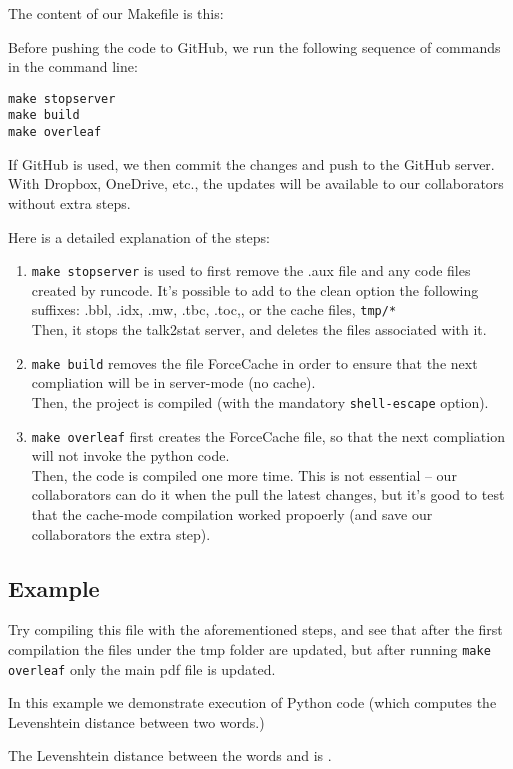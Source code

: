 \documentclass[12pt]{article}
\begin{document}
The content of our Makefile is this:

Before pushing the code to GitHub, we run the following sequence of commands in the command line:
\begin{tcolorbox}
\begin{Verbatim}
make stopserver
make build
make overleaf
\end{Verbatim}
\end{tcolorbox}
If GitHub is used, we then commit the changes and push to the GitHub server. With Dropbox, OneDrive, etc., the updates will be available to our collaborators without extra steps.

Here is a detailed explanation of the steps:
\begin{enumerate}
 \item \verb|make stopserver| is used to first remove the .aux file and any code files created by runcode. It's possible to add to the clean option the following suffixes: .bbl, .idx, .mw, .tbc, .toc,, or the cache files, \verb|tmp/*|\\
 Then, it stops the talk2stat server, and deletes the files associated with it.
 \item \verb|make build| removes the file ForceCache in order to ensure that the next compliation will be in server-mode (no cache).\\
 Then, the project is compiled (with the mandatory \verb|shell-escape| option).
 \item \verb|make overleaf| first creates the ForceCache file, so that the next compliation will not invoke the python code.\\
 Then, the code is compiled one more time. This is not essential -- our collaborators can do it when the pull the latest changes, but it's good to test that the cache-mode compilation worked propoerly (and save our collaborators the extra step).
\end{enumerate}


\subsection*{Example}
Try compiling this file with the aforementioned steps, and see that after the first compilation the files under the tmp folder are updated, but after running \verb|make overleaf| only the main pdf file is updated.

In this example we demonstrate execution of Python code (which computes the Levenshtein distance between two words.)


The Levenshtein distance between the words  and  is .
\end{document}
